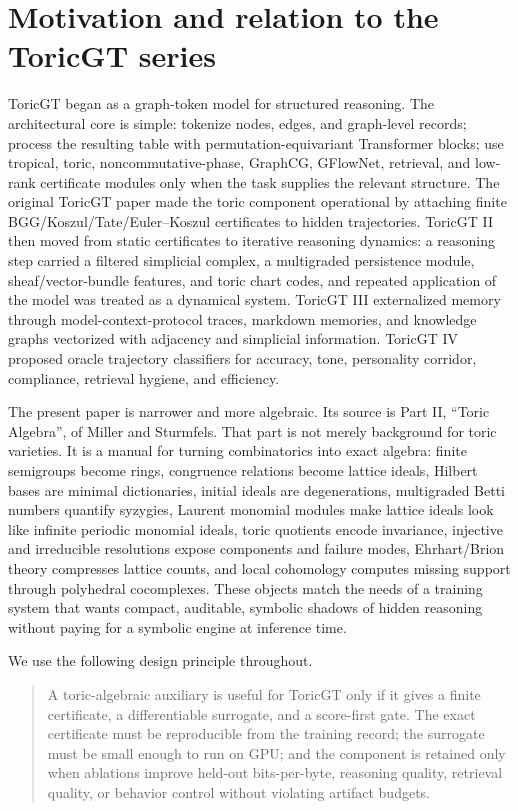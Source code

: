 \documentclass[11pt]{article}
\theoremstyle{definition}
\begin{document}
\section{Motivation and relation to the ToricGT series}
ToricGT began as a graph-token model for structured reasoning.  The architectural core is simple: tokenize nodes, edges, and graph-level records; process the resulting table with permutation-equivariant Transformer blocks; use tropical, toric, noncommutative-phase, GraphCG, GFlowNet, retrieval, and low-rank certificate modules only when the task supplies the relevant structure.  The original ToricGT paper made the toric component operational by attaching finite BGG/Koszul/Tate/Euler--Koszul certificates to hidden trajectories.  ToricGT II then moved from static certificates to iterative reasoning dynamics: a reasoning step carried a filtered simplicial complex, a multigraded persistence module, sheaf/vector-bundle features, and toric chart codes, and repeated application of the model was treated as a dynamical system.  ToricGT III externalized memory through model-context-protocol traces, markdown memories, and knowledge graphs vectorized with adjacency and simplicial information.  ToricGT IV proposed oracle trajectory classifiers for accuracy, tone, personality corridor, compliance, retrieval hygiene, and efficiency.

The present paper is narrower and more algebraic.  Its source is Part II, ``Toric Algebra'', of Miller and Sturmfels.  That part is not merely background for toric varieties.  It is a manual for turning combinatorics into exact algebra: finite semigroups become rings, congruence relations become lattice ideals, Hilbert bases are minimal dictionaries, initial ideals are degenerations, multigraded Betti numbers quantify syzygies, Laurent monomial modules make lattice ideals look like infinite periodic monomial ideals, toric quotients encode invariance, injective and irreducible resolutions expose components and failure modes, Ehrhart/Brion theory compresses lattice counts, and local cohomology computes missing support through polyhedral cocomplexes.  These objects match the needs of a training system that wants compact, auditable, symbolic shadows of hidden reasoning without paying for a symbolic engine at inference time.

We use the following design principle throughout.

\begin{quote}
A toric-algebraic auxiliary is useful for ToricGT only if it gives a finite certificate, a differentiable surrogate, and a score-first gate.  The exact certificate must be reproducible from the training record; the surrogate must be small enough to run on GPU; and the component is retained only when ablations improve held-out bits-per-byte, reasoning quality, retrieval quality, or behavior control without violating artifact budgets.
\end{quote}
\end{document}
